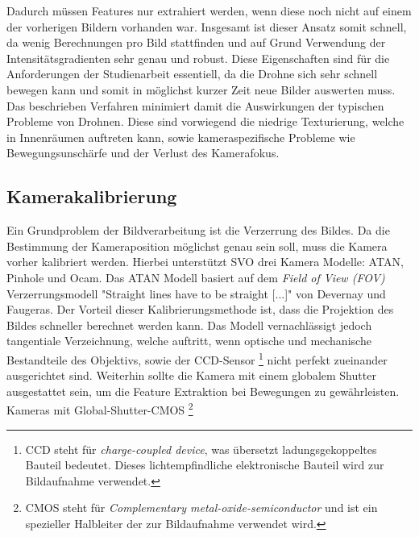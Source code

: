 Dadurch müssen Features nur extrahiert werden, wenn diese noch nicht auf einem der vorherigen Bildern vorhanden war. Insgesamt ist dieser Ansatz somit schnell, da wenig Berechnungen pro Bild stattfinden und auf Grund Verwendung der Intensitätsgradienten sehr genau und robust. \newline
Diese Eigenschaften sind für die Anforderungen der Studienarbeit essentiell, da die Drohne sich sehr schnell bewegen kann und somit in möglichst kurzer Zeit neue Bilder auswerten muss. Das beschrieben Verfahren minimiert damit die Auswirkungen der typischen Probleme von Drohnen. Diese sind vorwiegend die niedrige Texturierung, welche in Innenräumen auftreten kann, sowie kameraspezifische Probleme wie Bewegungsunschärfe und der Verlust des Kamerafokus.


\subsection{Kamerakalibrierung}
Ein Grundproblem der Bildverarbeitung ist die Verzerrung des Bildes. 
Da die Bestimmung der Kameraposition möglichst genau sein soll, muss die Kamera vorher kalibriert werden. \newline
Hierbei unterstützt SVO drei Kamera Modelle: ATAN, Pinhole und Ocam. \cite{svo_cameracalibration} \newline
Das ATAN Modell basiert auf dem \textit{Field of View \emph{(FOV)}} Verzerrungsmodell "Straight lines have to be straight [...]" von Devernay und Faugeras.\newline %
Der Vorteil dieser Kalibrierungsmethode ist, dass die Projektion des Bildes schneller berechnet werden kann. %
Das Modell vernachlässigt jedoch tangentiale Verzeichnung, welche auftritt, wenn optische und mechanische Bestandteile des Objektivs, sowie der CCD-Sensor 
\footnote{CCD steht für \emph{charge-coupled device}, was übersetzt ladungsgekoppeltes Bauteil bedeutet. Dieses lichtempfindliche elektronische Bauteil wird zur Bildaufnahme verwendet.} 
nicht perfekt zueinander ausgerichtet sind. %
Weiterhin sollte die Kamera mit einem globalem Shutter ausgestattet sein, um die Feature Extraktion bei Bewegungen zu gewährleisten. Kameras mit Global-Shutter-CMOS  
\footnote{CMOS steht für \emph{Complementary metal-oxide-semiconductor} und ist ein spezieller Halbleiter der zur Bildaufnahme verwendet wird.} %
